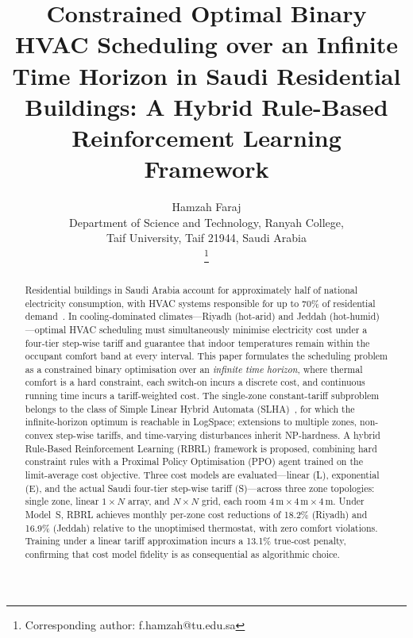 \documentclass[12pt,a4paper]{article}
\begin{document}
\title{\textbf{Constrained Optimal Binary HVAC Scheduling over an
Infinite Time Horizon in Saudi Residential Buildings: A Hybrid
Rule-Based Reinforcement Learning Framework}}

\author{
  Hamzah Faraj\\[3pt]
  Department of Science and Technology, Ranyah College,\\
  Taif University, Taif 21944, Saudi Arabia\\[3pt]
 \thanks{Corresponding author: f.hamzah@tu.edu.sa}
}
\date{}
\maketitle

\begin{abstract}
Residential buildings in Saudi Arabia account for approximately half of
national electricity consumption, with HVAC systems responsible for up
to 70\% of residential demand~\cite{AlHomoud2021}.
In cooling-dominated climates---Riyadh (hot-arid) and Jeddah
(hot-humid)---optimal HVAC scheduling must simultaneously minimise
electricity cost under a four-tier step-wise tariff and guarantee that
indoor temperatures remain within the occupant comfort band at every
interval.
This paper formulates the scheduling problem as a constrained binary
optimisation over an \emph{infinite time horizon}, where thermal comfort
is a hard constraint, each switch-on incurs a discrete cost, and
continuous running time incurs a tariff-weighted cost.
The single-zone constant-tariff subproblem belongs to the class of Simple
Linear Hybrid Automata (SLHA)~\cite{Mousa2018}, for which the
infinite-horizon optimum is reachable in LogSpace; extensions to multiple
zones, non-convex step-wise tariffs, and time-varying disturbances
inherit NP-hardness.
A hybrid Rule-Based Reinforcement Learning (RBRL) framework is proposed,
combining hard constraint rules with a Proximal Policy Optimisation (PPO)
agent trained on the limit-average cost objective.
Three cost models are evaluated---linear (L), exponential (E), and the
actual Saudi four-tier step-wise tariff (S)---across three zone
topologies: single zone, linear $1\times N$ array, and $N\times N$ grid,
each room $4\,\text{m}\times4\,\text{m}\times4\,\text{m}$.
Under Model~S, RBRL achieves monthly per-zone cost reductions of 18.2\%
(Riyadh) and 16.9\% (Jeddah) relative to the unoptimised thermostat,
with zero comfort violations.
Training under a linear tariff approximation incurs a 13.1\% true-cost
penalty, confirming that cost model fidelity is as consequential as
algorithmic choice.
\end{abstract}
\end{document}
